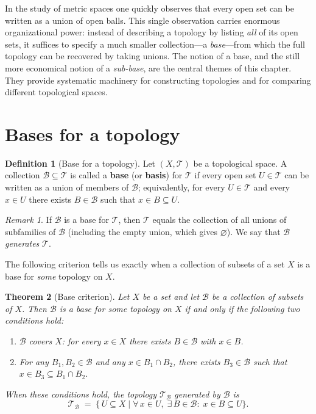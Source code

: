 \documentclass[11pt,a4paper,twoside]{book}
\newtheorem{theorem}{Theorem}[section]
\theoremstyle{remark}
\newtheorem{remark}[theorem]{Remark}
\theoremstyle{definition}
\theoremstyle{definition}
\newtheorem{definition}{Definition}[section]
\begin{document}
In the study of metric spaces one quickly observes that every open set can be
written as a union of open balls.  This single observation carries enormous
organizational power: instead of describing a topology by listing \emph{all} of
its open sets, it suffices to specify a much smaller collection---a
\emph{base}---from which the full topology can be recovered by taking unions.
The notion of a base, and the still more economical notion of a
\emph{sub-base}, are the central themes of this chapter.  They provide
systematic machinery for constructing topologies and for comparing different
topological spaces.

\section{Bases for a topology}
\label{sec:bases-def}

\begin{definition}[Base for a topology]
\label{def:base}
Let $(X,\mathscr{T})$ be a topological space.  A collection
$\mathscr{B}\subseteq\mathscr{T}$ is called a \textbf{base} (or
\textbf{basis}) for $\mathscr{T}$ if every open set $U\in\mathscr{T}$ can be
written as a union of members of $\mathscr{B}$; equivalently, for every
$U\in\mathscr{T}$ and every $x\in U$ there exists $B\in\mathscr{B}$ such that
$x\in B\subseteq U$.
\end{definition}

\begin{remark}
\label{rem:base-generates}
If $\mathscr{B}$ is a base for $\mathscr{T}$, then $\mathscr{T}$ equals
the collection of all unions of subfamilies of $\mathscr{B}$ (including the
empty union, which gives $\varnothing$).  We say that $\mathscr{B}$
\emph{generates} $\mathscr{T}$.
\end{remark}

The following criterion tells us exactly when a collection of subsets of a set
$X$ is a base for \emph{some} topology on $X$.

\begin{theorem}[Base criterion]
\label{thm:base-criterion}
Let $X$ be a set and let $\mathscr{B}$ be a collection of subsets of $X$.
Then $\mathscr{B}$ is a base for some topology on $X$ if and only if the
following two conditions hold:
\begin{enumerate}
    \item[(B1)] $\mathscr{B}$ covers $X$: for every $x\in X$ there exists
        $B\in\mathscr{B}$ with $x\in B$.
    \item[(B2)] For any $B_1,B_2\in\mathscr{B}$ and any $x\in B_1\cap B_2$,
        there exists $B_3\in\mathscr{B}$ such that $x\in B_3\subseteq
        B_1\cap B_2$.
\end{enumerate}
When these conditions hold, the topology $\mathscr{T}_{\mathscr{B}}$ generated
by $\mathscr{B}$ is
\[
    \mathscr{T}_{\mathscr{B}}
    \;=\;
    \bigl\{\, U\subseteq X \;\big|\;
        \forall\, x\in U,\;\exists\, B\in\mathscr{B}:\;
        x\in B\subseteq U
    \bigr\}.
\]
\end{theorem}
\end{document}
